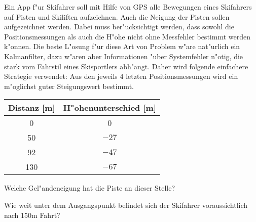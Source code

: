 Ein App f"ur Skifahrer soll mit Hilfe von GPS alle Bewegungen
eines Skifahrers auf Pisten und Skiliften aufzeichnen.
Auch die Neigung der Pisten sollen aufgezeichnet werden.
Dabei muss ber"ucksichtigt werden, dass sowohl die
Positionsmessungen als auch die H"ohe nicht ohne Messfehler
bestimmt werden k"onnen.  Die beste L"osung f"ur diese Art
von Problem w"are nat"urlich ein Kalmanfilter, dazu w"aren
aber Informationen "uber Systemfehler n"otig, die stark vom Fahrstil
eines Skisportlers abh"angt.  Daher wird folgende einfachere
Strategie verwendet: Aus den jeweils 4 letzten Positionsmessungen
wird ein m"oglichst guter Steigungswert bestimmt.
\begin{center}
\begin{tabular}{cc}
Distanz [m]&H"ohenunterschied [m]\\
\hline
 0&    0\\
50&$-27$\\
92&$-47$\\
130&$-67$\\
\hline
\end{tabular}
\end{center}
\begin{teilaufgaben}
\item
Welche Gel"andeneigung hat die Piste an dieser Stelle?
\item
Wie weit unter dem Ausgangspunkt befindet sich der Skifahrer
voraussichtlich nach 150m Fahrt?
\end{teilaufgaben}

